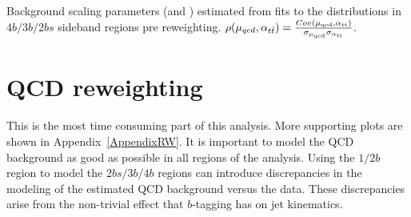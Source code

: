 \begin{table}[htbp!]
\begin{center}
\caption{Background scaling parameters (\muqcd and \alphatt) estimated from fits to the \mleadJ distributions in $4b/3b/2bs$ sideband regions pre reweighting. $\rho(\mu_{qcd},\alpha_{t\bar{t}}) = \frac{Cov(\rm \mu_{qcd},\rm \alpha_{\rm tt})}{\rm \sigma_{\mu_{qcd}} \rm \sigma_{\rm \alpha_{ tt}} }$.}

\label{tab:bkgfit_prereweight}
\end{center}
\end{table}



\section{QCD reweighting}
\label{sec:boosted-reweight}

\paragraph{}
This is the most time consuming part of this analysis. 
More supporting plots are shown in Appendix~\ref{AppendixRW}.
It is important to model the QCD background as good as possible in all regions of the analysis.
Using the $1/2b$ region to model the $2bs/3b/4b$ regions can introduce discrepancies in the modeling of the estimated QCD background versus the data. 
These discrepancies arise from the non-trivial effect that $b$-tagging has on jet kinematics.

